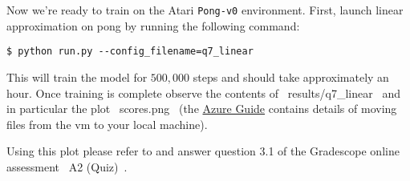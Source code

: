 \item {}

Now we're ready to train on the Atari \texttt{Pong-v0} environment. First, launch linear approximation on pong by running the following command:
\begin{lstlisting}
$ python run.py --config_filename=q7_linear
\end{lstlisting} 
This will train the model for $500,000$ steps and should take approximately an hour. Once training is complete observe the contents of ~results/q7_linear~ and in particular the plot ~scores.png~ (the \href{https://github.com/scpd-proed/XCS234-Handouts/blob/main/Azure/Azure%20Guide.pdf}{Azure Guide} contains details of moving files from the vm to your local machine). 

Using this plot please refer to and answer question 3.1 of the Gradescope online assessment ~A2 (Quiz)~. 
